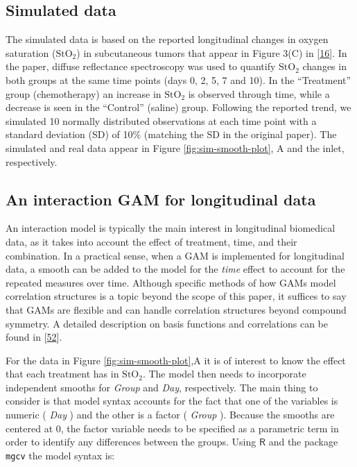 \documentclass[
]{article}
\newcommand{\passthrough}[1]{#1}
\begin{document}
\hypertarget{simulated-data}{%
\subsection{Simulated data}\label{simulated-data}}

The simulated data is based on the reported longitudinal changes in oxygen saturation (\(\mbox{StO}_2\)) in subcutaneous tumors that appear in Figure 3(C) in {[}\protect\hyperlink{ref-vishwanath2009}{16}{]}. In the paper, diffuse reflectance spectroscopy was used to quantify \(\mbox{StO}_2\) changes in both groups at the same time points (days 0, 2, 5, 7 and 10). In the ``Treatment'' group (chemotherapy) an increase in \(\mbox{StO}_2\) is observed through time, while a decrease is seen in the ``Control'' (saline) group. Following the reported trend, we simulated 10 normally distributed observations at each time point with a standard deviation (SD) of 10\% (matching the SD in the original paper).
The simulated and real data appear in Figure \ref{fig:sim-smooth-plot}, A and the inlet, respectively.

\hypertarget{an-interaction-gam-for-longitudinal-data}{%
\subsection{An interaction GAM for longitudinal data}\label{an-interaction-gam-for-longitudinal-data}}

An interaction model is typically the main interest in longitudinal biomedical data, as it takes into account the effect of treatment, time, and their combination. In a practical sense, when a GAM is implemented for longitudinal data, a smooth can be added to the model for the \emph{time} effect to account for the repeated measures over time. Although specific methods of how GAMs model correlation structures is a topic beyond the scope of this paper, it suffices to say that GAMs are flexible and can handle correlation structures beyond compound symmetry. A detailed description on basis functions and correlations can be found in {[}\protect\hyperlink{ref-hefley2017}{52}{]}.

For the data in Figure \ref{fig:sim-smooth-plot},A it is of interest to know the effect that each treatment has in \(\mbox{StO}_2\). The model then needs to incorporate independent smooths for \emph{Group} and \emph{Day}, respectively. The main thing to consider is that model syntax accounts for the fact that one of the variables is numeric ( \emph{Day} ) and the other is a factor ( \emph{Group} ). Because the smooths are centered at 0, the factor variable needs to be specified as a parametric term in order to identify any differences between the groups. Using \(\textsf{R}\) and the package \passthrough{\lstinline!mgcv!} the model syntax is:
\end{document}
